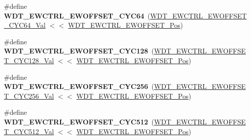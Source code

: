 \begin{DoxyCompactItemize}
\item 
\hypertarget{group___s_a_m_l21___w_d_t_ga6fda2b5d22d96624618d220b15bfd66b}{}\#define {\bfseries W\+D\+T\+\_\+\+E\+W\+C\+T\+R\+L\+\_\+\+E\+W\+O\+F\+F\+S\+E\+T\+\_\+\+C\+Y\+C64}~(\hyperlink{group___s_a_m_l21___w_d_t_gaac5bdb4b6c7616f440514dbd3dd59046}{W\+D\+T\+\_\+\+E\+W\+C\+T\+R\+L\+\_\+\+E\+W\+O\+F\+F\+S\+E\+T\+\_\+\+C\+Y\+C64\+\_\+\+Val} $<$$<$ \hyperlink{group___s_a_m_l21___w_d_t_gabb7809711cdf296121c2108b55d3ad33}{W\+D\+T\+\_\+\+E\+W\+C\+T\+R\+L\+\_\+\+E\+W\+O\+F\+F\+S\+E\+T\+\_\+\+Pos})\label{group___s_a_m_l21___w_d_t_ga6fda2b5d22d96624618d220b15bfd66b}

\item 
\hypertarget{group___s_a_m_l21___w_d_t_ga52946261830c9c31e5284a9434e01179}{}\#define {\bfseries W\+D\+T\+\_\+\+E\+W\+C\+T\+R\+L\+\_\+\+E\+W\+O\+F\+F\+S\+E\+T\+\_\+\+C\+Y\+C128}~(\hyperlink{group___s_a_m_l21___w_d_t_ga24a8548c24ad2cdf41ad77b241ec63dd}{W\+D\+T\+\_\+\+E\+W\+C\+T\+R\+L\+\_\+\+E\+W\+O\+F\+F\+S\+E\+T\+\_\+\+C\+Y\+C128\+\_\+\+Val} $<$$<$ \hyperlink{group___s_a_m_l21___w_d_t_gabb7809711cdf296121c2108b55d3ad33}{W\+D\+T\+\_\+\+E\+W\+C\+T\+R\+L\+\_\+\+E\+W\+O\+F\+F\+S\+E\+T\+\_\+\+Pos})\label{group___s_a_m_l21___w_d_t_ga52946261830c9c31e5284a9434e01179}

\item 
\hypertarget{group___s_a_m_l21___w_d_t_ga3276acabeb3b1466440524a81a765a62}{}\#define {\bfseries W\+D\+T\+\_\+\+E\+W\+C\+T\+R\+L\+\_\+\+E\+W\+O\+F\+F\+S\+E\+T\+\_\+\+C\+Y\+C256}~(\hyperlink{group___s_a_m_l21___w_d_t_gacc1a3dfab64345f1b995361254cd610d}{W\+D\+T\+\_\+\+E\+W\+C\+T\+R\+L\+\_\+\+E\+W\+O\+F\+F\+S\+E\+T\+\_\+\+C\+Y\+C256\+\_\+\+Val} $<$$<$ \hyperlink{group___s_a_m_l21___w_d_t_gabb7809711cdf296121c2108b55d3ad33}{W\+D\+T\+\_\+\+E\+W\+C\+T\+R\+L\+\_\+\+E\+W\+O\+F\+F\+S\+E\+T\+\_\+\+Pos})\label{group___s_a_m_l21___w_d_t_ga3276acabeb3b1466440524a81a765a62}

\item 
\hypertarget{group___s_a_m_l21___w_d_t_ga7e3c04f595a8d8194c09f95c09820b00}{}\#define {\bfseries W\+D\+T\+\_\+\+E\+W\+C\+T\+R\+L\+\_\+\+E\+W\+O\+F\+F\+S\+E\+T\+\_\+\+C\+Y\+C512}~(\hyperlink{group___s_a_m_l21___w_d_t_ga9de5c16a1592d6967a3fbf429af4ce75}{W\+D\+T\+\_\+\+E\+W\+C\+T\+R\+L\+\_\+\+E\+W\+O\+F\+F\+S\+E\+T\+\_\+\+C\+Y\+C512\+\_\+\+Val} $<$$<$ \hyperlink{group___s_a_m_l21___w_d_t_gabb7809711cdf296121c2108b55d3ad33}{W\+D\+T\+\_\+\+E\+W\+C\+T\+R\+L\+\_\+\+E\+W\+O\+F\+F\+S\+E\+T\+\_\+\+Pos})\label{group___s_a_m_l21___w_d_t_ga7e3c04f595a8d8194c09f95c09820b00}


\end{DoxyCompactItemize}
